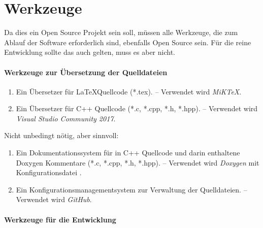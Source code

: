 \section{Werkzeuge}%
\label{sec:Werkzeuge}

Da dies ein Open Source Projekt sein soll,
müssen alle Werkzeuge,
die zum Ablauf der Software erforderlich sind,
ebenfalls Open Source sein.
Für die reine Entwicklung sollte das auch gelten, muss es aber nicht.

\paragraph{Werkzeuge zur Übersetzung der Quelldateien}%

\begin{enumerate}

	\item\label{Werkzeug:LaTeX}
	Ein Übersetzer für \LaTeX Quellcode (*.tex).
	-- Verwendet wird \emph{MiK\TeX}.

	\item\label{Werkzeug:C++}
	Ein Übersetzer für C++ Quellcode (*.c, *.cpp, *.h, *.hpp).
	-- Verwendet wird \emph{Visual Studio Community 2017}.

	\setcounter{Enumi}{\value{enumi}}%
\end{enumerate}
%
Nicht unbedingt nötig, aber sinnvoll:
\begin{enumerate}
	\setcounter{enumi}{\value{Enumi}}%

	\item\label{Werkzeug:Dokumentation}
	Ein Dokumentationssystem für in C++ Quellcode und darin enthaltene Doxygen Kommentare (*.c, *.cpp, *.h, *.hpp).
	-- Verwendet wird \emph{Doxygen} mit Konfigurationsdatei .

	\item\label{Werkzeug:Konfigurationsmanagement}
	Ein Konfigurationsmanagementsystem zur Verwaltung der Quelldateien.
	-- Verwendet wird \emph{GitHub}.

	\setcounter{Enumi}{\value{enumi}}%
\end{enumerate}

\paragraph{Werkzeuge für die Entwicklung}%


